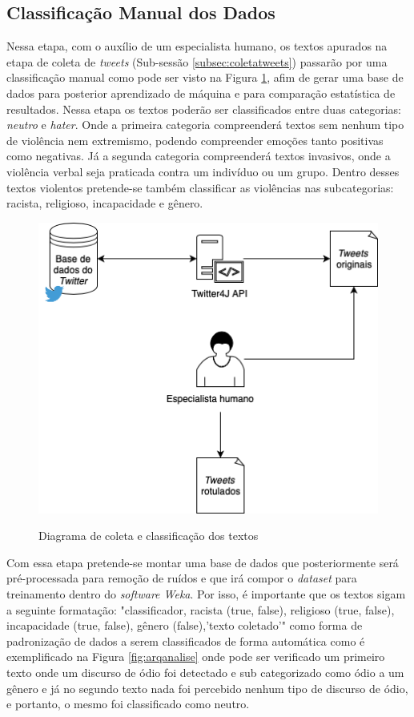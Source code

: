 \subsection{Classificação Manual dos Dados}
\label{subsec:classmanual}
Nessa etapa, com o auxílio de um especialista humano, os textos apurados na etapa de coleta de \textit{tweets} (Sub-sessão \ref{subsec:coletatweets}) passarão por uma classificação manual como pode ser visto na Figura \ref{fig:classificacaotextos}, afim de gerar uma base de dados para posterior aprendizado de máquina e para comparação estatística de resultados. 
Nessa etapa os textos poderão ser classificados entre duas categorias: \textit{neutro} e \textit{hater}. Onde a primeira categoria compreenderá textos sem nenhum tipo de violência nem extremismo, podendo compreender emoções tanto positivas como negativas. Já a segunda categoria compreenderá textos invasivos, onde a violência verbal seja praticada contra um indivíduo ou um grupo. Dentro desses textos violentos pretende-se também classificar as violências nas subcategorias: racista, religioso, incapacidade e gênero.  

\begin{figure}[!h]
\centering 
\caption{Diagrama de coleta e classificação dos textos}
\includegraphics[scale=0.50]{imagens/coletatweets.png}
\label{fig:classificacaotextos}
\end{figure}

Com essa etapa pretende-se montar uma base de dados que posteriormente será pré-processada para remoção de ruídos e que irá compor o \textit{dataset} para treinamento dentro do \textit{software Weka}. Por isso, é importante que os textos sigam a seguinte formatação: "classificador, racista (true, false), religioso (true, false), incapacidade (true, false), gênero (false),'texto coletado'" como forma de padronização de dados a serem classificados de forma automática como é exemplificado na Figura \ref{fig:arqanalise} onde pode ser verificado um primeiro texto onde um discurso de ódio foi detectado e sub categorizado como ódio a um gênero e já no segundo texto nada foi percebido nenhum tipo de discurso de ódio, e portanto, o mesmo foi classificado como neutro.

